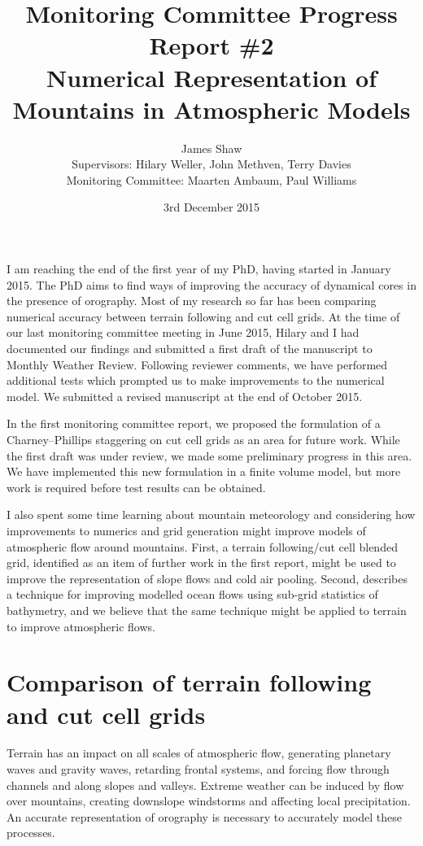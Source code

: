 \documentclass[a4paper]{article}
\title{Monitoring Committee Progress Report \#2\\
\vspace*{1em}
\Large{Numerical Representation of Mountains in Atmospheric Models}}
\author{James Shaw
\vspace{0.5em} \\
\large{Supervisors: Hilary Weller, John Methven, Terry Davies}
\vspace{0.5em} \\
\large{Monitoring Committee: Maarten Ambaum, Paul Williams}}
\date{3rd December 2015}
\begin{document}
\newcommand{\exner}{\Pi}
\newcommand{\TODO}[1]{\textcolor{purple}{TODO: \emph{#1}}}
\maketitle


I am reaching the end of the first year of my PhD, having started in January 2015.
The PhD aims to find ways of improving the accuracy of dynamical cores in the presence of orography.
Most of my research so far has been comparing numerical accuracy between terrain following and cut cell grids.
At the time of our last monitoring committee meeting in June 2015, Hilary and I had documented our findings and submitted a first draft of the manuscript to Monthly Weather Review.  Following reviewer comments, we have performed additional tests which prompted us to make improvements to the numerical model.  We submitted a revised manuscript at the end of October 2015.

In the first monitoring committee report, we proposed the formulation of a Charney--Phillips staggering on cut cell grids as an area for future work.  While the first draft was under review, we made some preliminary progress in this area.  We have implemented this new formulation in a finite volume model, but more work is required before test results can be obtained.

I also spent some time learning about mountain meteorology and considering how improvements to numerics and grid generation might improve models of atmospheric flow around mountains.  First, a terrain following/cut cell blended grid, identified as an item of further work in the first report, might be used to improve the representation of slope flows and cold air pooling.  Second, \citet{adcroft2013} describes a technique for improving modelled ocean flows using sub-grid statistics of bathymetry, and we believe that the same technique might be applied to terrain to improve atmospheric flows.

\section{Comparison of terrain following and cut cell grids}
Terrain has an impact on all scales of atmospheric flow, generating planetary waves and gravity waves, retarding frontal systems, and forcing flow through channels and along slopes and valleys.  Extreme weather can be induced by flow over mountains, creating downslope windstorms and affecting local precipitation.  An accurate representation of orography is necessary to accurately model these processes.
\end{document}
